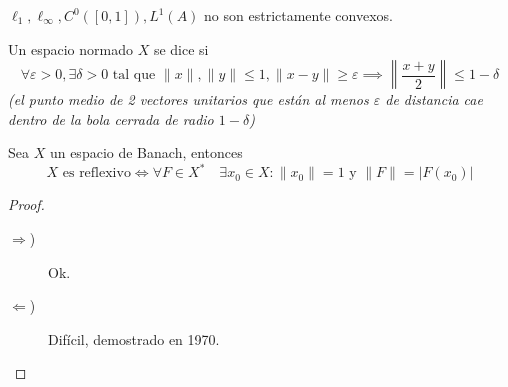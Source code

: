 \begin{ejercicio}
    $\ell_1, \ell_\infty, C^0([0,1]), L^1(A)$ no son estrictamente convexos.
\end{ejercicio}

\begin{definicion}
    Un espacio normado $X$ se dice  si 
    \begin{equation*}
        \forall \varepsilon > 0, \exists \delta > 0 \text{ tal que } \|x\|, \|y\| \leq 1, \|x - y\| \ge \varepsilon \implies \left\| \frac{x+y}{2} \right\| \leq 1 - \delta
    \end{equation*}
    \textit{\small (el punto medio de 2 vectores unitarios que están al menos $\varepsilon$ de distancia cae dentro de la bola cerrada de radio $1 - \delta$)}
\end{definicion}

\begin{lema}
    Sea $X$ un espacio de Banach, entonces
    \begin{equation*}
        X \text{ es reflexivo} \iff \forall F \in X^* \quad \exists x_0 \in X : \|x_0\| = 1 \text{ y } \|F\| = |F(x_0)|
    \end{equation*}
\begin{proof}
    \begin{description}
        \item[$\Longrightarrow$)] Ok.
        \item[$\Longleftarrow$)] Difícil, demostrado en 1970.
    \end{description}
\end{proof}
\end{lema}

